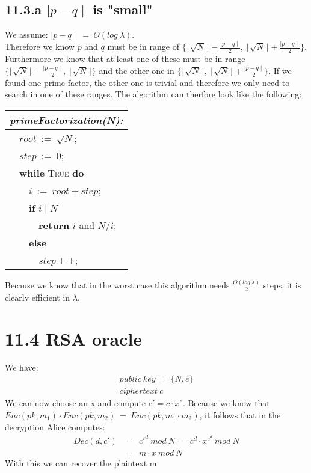 \documentclass{report}
\begin{document}
	\subsection*{11.3.a $\mid p - q \mid$ is "small"}
	We assume: $\mid p-q \mid \ = \ O(log \ \lambda)$. \\
	Therefore we know $p$ and $q$ must be in range of $\{\lfloor\sqrt{N}\rfloor - \frac{\mid p - q \mid}{2}, \ \lfloor\sqrt{N}\rfloor + \frac{\mid p - q \mid}{2}\}$. Furthermore we know that at least one of these must be in range $\{\lfloor\sqrt{N}\rfloor - \frac{\mid p - q \mid}{2}, \ \lfloor\sqrt{N}\rfloor\}$ and the other one in $\{\lfloor\sqrt{N}\rfloor, \ \lfloor\sqrt{N}\rfloor + \frac{\mid p - q \mid}{2}\}$. If we found one prime factor, the other one is trivial and therefore we only need to search in one of these ranges. The algorithm can therfore look like the following: \\
	\begin{center}	
		\begin{tabular}{|l|}
			\hline
			\cellcolor{gray!80} \textbf{\textit{primeFactorization(N):}} \\
			\hline
			\ \ $root \ := \ \sqrt{N}$; \\
			\ \ $step \ := \ 0$; \\
			\ \ \textbf{while} \textsc{True} \textbf{do} \\
			\ \ \ \ $i \ := \ root + step$; \\
			\ \ \ \ \textbf{if} $i \mid N$ \\
			\ \ \ \ \ \ \textbf{return} $i$ and $N/i$; \\
			\ \ \ \ \textbf{else} \\
			\ \ \ \ \ \ $step++$; \\
			\hline
		\end{tabular}
	\end{center}
	Because we know that in the worst case this algorithm needs $\frac{O(log \ \lambda)}{2}$ steps, it is clearly efficient in $\lambda$.
	\section*{11.4 RSA oracle}
		We have:
		\begin{align*}
			public \ key \ = \ \{ N,e \} \\
			ciphertext \ c
		\end{align*}
		We can now choose an x and compute $c' = c \cdot x^e$. Because we know that $Enc(pk, m_1) \cdot Enc(pk, m_2) \ = \ Enc(pk, m_1 \cdot m_2)$, it follows that in the decryption Alice computes:
		\begin{align*}
			Dec(d, c') \ & = \ c'^d \ mod \ N \ = \ c^d \cdot x^{e^d} \ mod \ N \\
			& = \ m \cdot x \ mod \ N
		\end{align*}
		With this we can recover the plaintext m.
\end{document}
